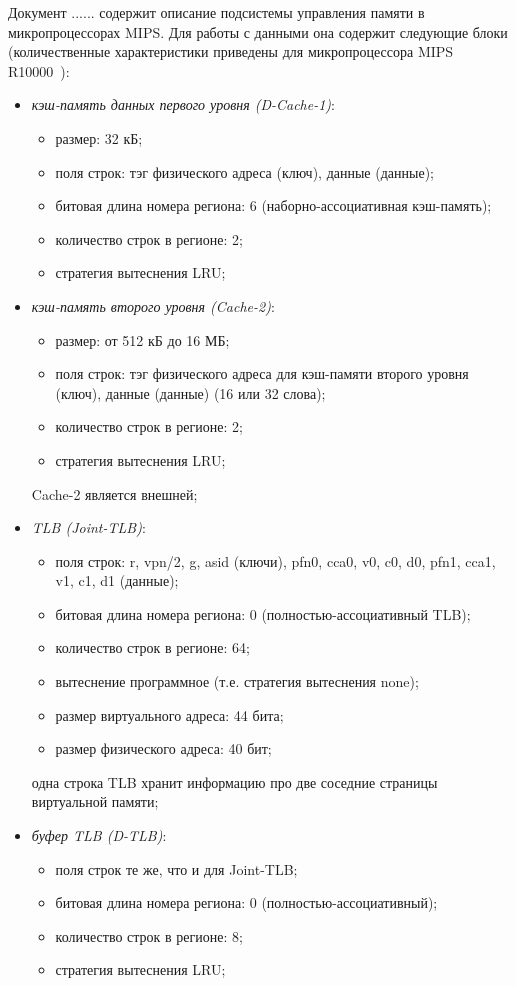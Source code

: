 \documentclass[14pt]{extreport}
\newcommand{\LRU}{\textsf{LRU}\xspace}
\begin{document}
Документ ...... содержит описание подсистемы управления памяти в микропроцессорах
MIPS. Для работы с данными она содержит следующие блоки (количественные
характеристики приведены для микропроцессора MIPS R10000~\cite{R10000}):
\begin{itemize}
  \item \emph{кэш-память данных первого уровня (D-Cache-1)}:
        \begin{itemize}
            \item размер: 32 кБ;
            \item поля строк: тэг физического адреса (ключ), данные (данные);
            \item битовая длина номера региона: 6 (наборно-ассоциативная кэш-память);
            \item количество строк в регионе: 2;
            \item стратегия вытеснения \LRU;
        \end{itemize}
  \item \emph{кэш-память второго уровня (Cache-2)}:
        \begin{itemize}
            \item размер: от 512 кБ до 16 МБ;
            \item поля строк: тэг физического адреса для кэш-памяти второго уровня (ключ), данные (данные) (16 или 32 слова);
            \item количество строк в регионе: 2;
            \item стратегия вытеснения \LRU;
        \end{itemize}
         Cache-2 является внешней;
  \item \emph{TLB (Joint-TLB)}:
        \begin{itemize}
            \item поля строк: r, vpn/2, g, asid (ключи), pfn0, cca0, v0, c0, d0, pfn1, cca1, v1, c1, d1 (данные);
            \item битовая длина номера региона: 0 (полностью-ассоциативный TLB);
            \item количество строк в регионе: 64;
            \item вытеснение программное (т.е. стратегия вытеснения none);
            \item размер виртуального адреса: 44 бита;
            \item размер физического адреса: 40 бит;
        \end{itemize}
        одна строка TLB хранит информацию про две соседние страницы виртуальной
        памяти;
  \item \emph{буфер TLB (D-TLB)}:
        \begin{itemize}
            \item поля строк те же, что и для Joint-TLB;
            \item битовая длина номера региона: 0 (полностью-ассоциативный);
            \item количество строк в регионе: 8;
            \item стратегия вытеснения \LRU;
        \end{itemize}
\end{itemize}
\end{document}
